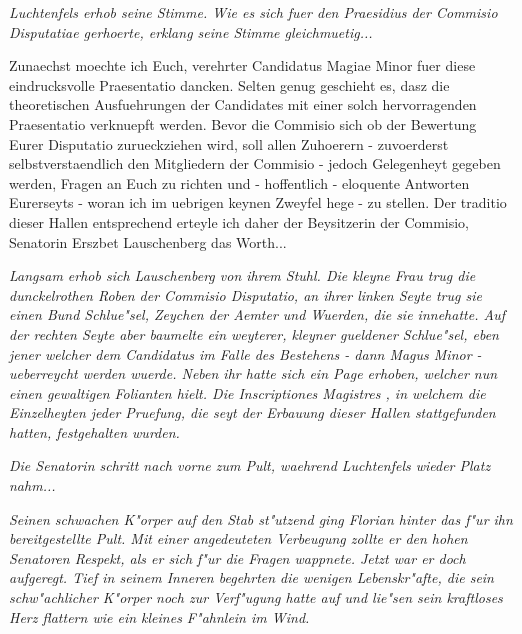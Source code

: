 \documentclass[a5paper,8pt]{book}
\begin{document}
\textit{Luchtenfels erhob seine Stimme. Wie es sich fuer den Praesidius der Commisio Disputatiae gerhoerte, erklang seine Stimme gleichmuetig...}

\grqq Zunaechst moechte ich Euch, verehrter Candidatus Magiae Minor fuer diese eindrucksvolle Praesentatio dancken. Selten genug geschieht es, dasz die theoretischen Ausfuehrungen der Candidates mit einer solch hervorragenden Praesentatio verknuepft werden. Bevor die Commisio sich ob der Bewertung Eurer Disputatio zurueckziehen wird, soll allen Zuhoerern - zuvoerderst selbstverstaendlich den Mitgliedern der Commisio - jedoch Gelegenheyt gegeben werden, Fragen an Euch zu richten und - hoffentlich - eloquente Antworten Eurerseyts - woran ich im uebrigen keynen Zweyfel hege - zu stellen. Der traditio dieser Hallen entsprechend erteyle ich daher der Beysitzerin der Commisio, Senatorin Erszbet Lauschenberg das Worth... \grqq

\textit{Langsam erhob sich Lauschenberg von ihrem Stuhl. Die kleyne Frau trug die dunckelrothen Roben der Commisio Disputatio, an ihrer linken Seyte trug sie einen Bund Schlue"sel, Zeychen der Aemter und Wuerden, die sie innehatte. Auf der rechten Seyte aber baumelte ein weyterer, kleyner gueldener Schlue"sel, eben jener welcher dem Candidatus im Falle des Bestehens - dann Magus Minor - ueberreycht werden wuerde.
Neben ihr hatte sich ein Page erhoben, welcher nun einen gewaltigen Folianten hielt. Die \grqq Inscriptiones Magistres \grqq , in welchem die Einzelheyten jeder Pruefung, die seyt der Erbauung dieser Hallen stattgefunden hatten, festgehalten wurden.}

\textit{Die Senatorin schritt nach vorne zum Pult, waehrend Luchtenfels wieder Platz nahm... }

\textit{Seinen schwachen K"orper auf den Stab st"utzend ging Florian hinter das f"ur ihn bereitgestellte Pult. Mit einer angedeuteten Verbeugung zollte er den hohen Senatoren Respekt, als er sich f"ur die Fragen wappnete.
Jetzt war er doch aufgeregt. Tief in seinem Inneren begehrten die wenigen Lebenskr"afte, die sein schw"achlicher K"orper noch zur Verf"ugung hatte auf und lie"sen sein kraftloses Herz flattern wie ein kleines F"ahnlein im Wind.}
\end{document}
